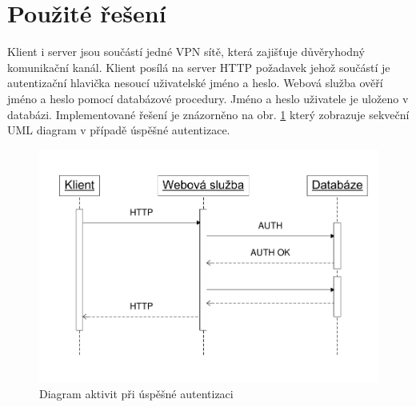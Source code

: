 \documentclass{bakalarka}
\begin{document}
\section{Použité řešení}
Klient i server jsou součástí jedné VPN sítě, která zajišťuje důvěryhodný komunikační kanál.  Klient posílá na server HTTP požadavek jehož součástí je autentizační hlavička nesoucí uživatelské jméno a heslo. Webová služba ověří jméno a heslo pomocí databázové procedury. Jméno a heslo uživatele je uloženo v databázi. Implementované řešení je znázorněno na obr. \ref{obr:auth} který zobrazuje sekveční UML diagram v případě úspěšné autentizace.
\begin{figure}[H]
  \centering
  \includegraphics[scale=0.8]{visio/auth.pdf}
\caption{Diagram aktivit při úspěšné autentizaci}
\label{obr:auth}
\end{figure}
\end{document}
